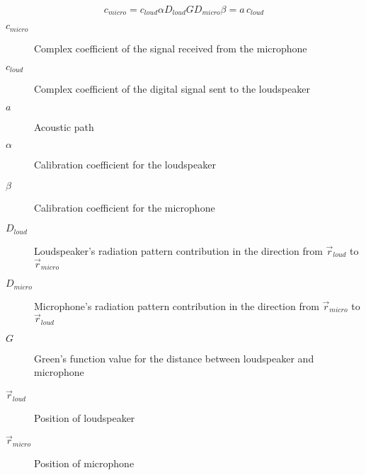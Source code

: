 %

\begin{equation}
c_\mathit{micro} = c_\mathit{loud} \alpha D_{loud} G D_{micro} \beta = a \, c_\mathit{loud}
\label{transEquationCalibration}
\end{equation}

\begin{description}
	\item[$c_\mathit{micro}$] Complex coefficient of the signal received from the microphone
	\item[$c_\mathit{loud}$] Complex coefficient of the digital signal sent to the loudspeaker
	\item[$a$] Acoustic path
	\item[$\alpha$] Calibration coefficient for the loudspeaker
	\item[$\beta$] Calibration coefficient for the microphone
	\item[$D_{loud}$] Loudspeaker's radiation pattern contribution in the direction from $\vec{r}_{loud}$ to $\vec{r}_{micro}$
	\item[$D_{micro}$] Microphone's radiation pattern contribution in the direction from $\vec{r}_{micro}$ to $\vec{r}_{loud}$ 
	\item[$G$] Green's function value for the distance between loudspeaker and microphone
	\item[$\vec{r}_{loud}$] Position of loudspeaker
	\item[$\vec{r}_{micro}$] Position of microphone
\end{description}

